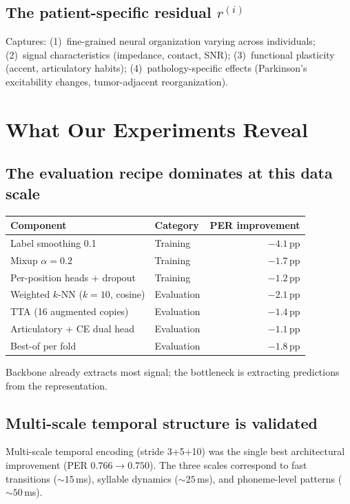 \documentclass[11pt,letterpaper]{article}
\newcommand{\pp}{\,\text{pp}}
\begin{document}
\subsection{The patient-specific residual $r^{(i)}$}

Captures: (1)~fine-grained neural organization varying across individuals; (2)~signal characteristics (impedance, contact, SNR); (3)~functional plasticity (accent, articulatory habits); (4)~pathology-specific effects (Parkinson's excitability changes, tumor-adjacent reorganization).


\section{What Our Experiments Reveal}

\subsection{The evaluation recipe dominates at this data scale}

\begin{table}[h]
\centering\small
\begin{tabular}{@{}llr@{}}
\toprule
\textbf{Component} & \textbf{Category} & \textbf{PER improvement} \\
\midrule
Label smoothing 0.1 & Training & $-4.1\pp$ \\
Mixup $\alpha{=}0.2$ & Training & $-1.7\pp$ \\
Per-position heads + dropout & Training & $-1.2\pp$ \\
\midrule
Weighted $k$-NN ($k{=}10$, cosine) & Evaluation & $-2.1\pp$ \\
TTA (16 augmented copies) & Evaluation & $-1.4\pp$ \\
Articulatory + CE dual head & Evaluation & $-1.1\pp$ \\
Best-of per fold & Evaluation & $-1.8\pp$ \\
\bottomrule
\end{tabular}
\end{table}

\noindent Backbone already extracts most signal; the bottleneck is extracting predictions from the representation.

\subsection{Multi-scale temporal structure is validated}

Multi-scale temporal encoding (stride 3+5+10) was the single best architectural improvement (PER $0.766 \to 0.750$). The three scales correspond to fast transitions (${\sim}15$\,ms), syllable dynamics (${\sim}25$\,ms), and phoneme-level patterns (${\sim}50$\,ms).
\end{document}
